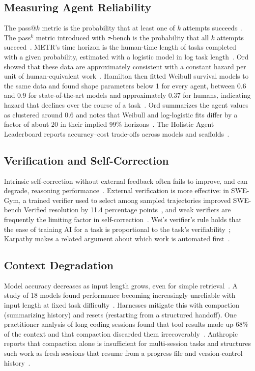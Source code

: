 \documentclass[journal]{IEEEtran}
\begin{document}
\subsection{Measuring Agent Reliability}
The pass@$k$ metric is the probability that at least one of $k$ attempts succeeds~\cite{chen2021}. The pass$^k$ metric introduced with $\tau$-bench is the probability that all $k$ attempts succeed~\cite{yao2024}. METR's time horizon is the human-time length of tasks completed with a given probability, estimated with a logistic model in log task length~\cite{kwa2025}. Ord showed that these data are approximately consistent with a constant hazard per unit of human-equivalent work~\cite{ord2025}. Hamilton then fitted Weibull survival models to the same data and found shape parameters below 1 for every agent, between 0.6 and 0.9 for state-of-the-art models and approximately 0.37 for humans, indicating hazard that declines over the course of a task~\cite{hamilton2026}. Ord summarizes the agent values as clustered around 0.6 and notes that Weibull and log-logistic fits differ by a factor of about 20 in their implied 99\% horizons~\cite{ord2026}. The Holistic Agent Leaderboard reports accuracy--cost trade-offs across models and scaffolds~\cite{hal2026}.

\subsection{Verification and Self-Correction}
Intrinsic self-correction without external feedback often fails to improve, and can degrade, reasoning performance~\cite{huang2024}. External verification is more effective: in SWE-Gym, a trained verifier used to select among sampled trajectories improved SWE-bench Verified resolution by 11.4 percentage points~\cite{pan2025}, and weak verifiers are frequently the limiting factor in self-correction~\cite{zhang2024}. Wei's verifier's rule holds that the ease of training AI for a task is proportional to the task's verifiability~\cite{wei2025}; Karpathy makes a related argument about which work is automated first~\cite{karpathy2025}.

\subsection{Context Degradation}
Model accuracy decreases as input length grows, even for simple retrieval~\cite{liu2024,hong2025}. A study of 18 models found performance becoming increasingly unreliable with input length at fixed task difficulty~\cite{hong2025}. Harnesses mitigate this with compaction (summarizing history) and resets (restarting from a structured handoff). One practitioner analysis of long coding sessions found that tool results made up 68\% of the context and that compaction discarded them irrecoverably~\cite{faafo2026}. Anthropic reports that compaction alone is insufficient for multi-session tasks and structures such work as fresh sessions that resume from a progress file and version-control history~\cite{anthropic2025long}.
\end{document}
